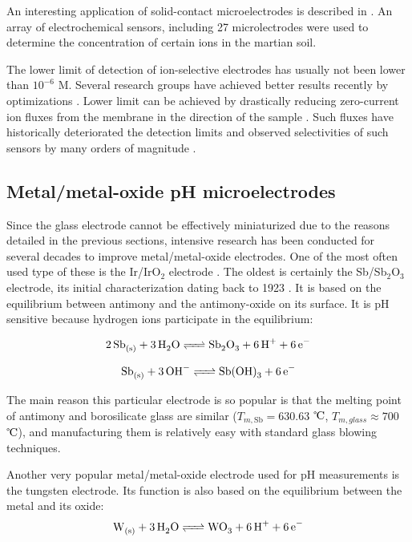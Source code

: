 An interesting application of solid-contact microelectrodes is described in \cite{kounaves2002determination}.
An array of electrochemical sensors, including 27 microlectrodes were used to determine the concentration of certain ions in the martian soil.

The lower limit of detection of ion-selective electrodes has usually not been lower than $10^{-6}$ M.
Several research groups have achieved better results recently by optimizations \cite{sodergaard2003lowering}.
Lower limit can be achieved by drastically reducing zero-current ion fluxes from the membrane in the direction of the sample \cite{malon2006potentiometry}.
Such fluxes have historically deteriorated the detection limits and observed selectivities of such sensors by many orders of magnitude \cite{sutter2004solid}.

\subsection{Metal/metal-oxide pH microelectrodes}
Since the glass electrode cannot be effectively miniaturized due to the reasons detailed in the previous sections, intensive research has been conducted for several decades to improve metal/metal-oxide electrodes.
One of the most often used type of these is the Ir/IrO$_2$ electrode \cite{beyenal2004improved}.
The oldest is certainly the Sb/Sb$_2$O$_3$ electrode, its initial characterization dating back to 1923 \cite{uhl1923electrometric}.
It is based on the equilibrium between antimony and the antimony-oxide on its surface.
It is pH sensitive because hydrogen ions participate in the equilibrium:

\begin{equation}
        \ce{2Sb_{(s)} + 3H_2O <=> Sb_2O_3 + 6H^+ + 6e^-}
\end{equation}

\begin{equation}
        \ce{Sb_{(s)} + 3OH^- <=> Sb(OH)_3 + 6e^-}
\end{equation}

The main reason this particular electrode is so popular is that the melting point of antimony and borosilicate glass are similar ($T_{m, \textrm{Sb}} = 630.63$ $\celsius$, $T_{m, glass}\approx 700$ $\celsius$), and manufacturing them is relatively easy with standard glass blowing techniques.

Another very popular metal/metal-oxide electrode used for pH measurements is the tungsten electrode. Its function is also based on the equilibrium between the metal and its oxide:
\begin{equation}
        \ce{W_{(s)} + 3H_2O <=> WO_3 + 6H^+ + 6e^-}
\end{equation}


